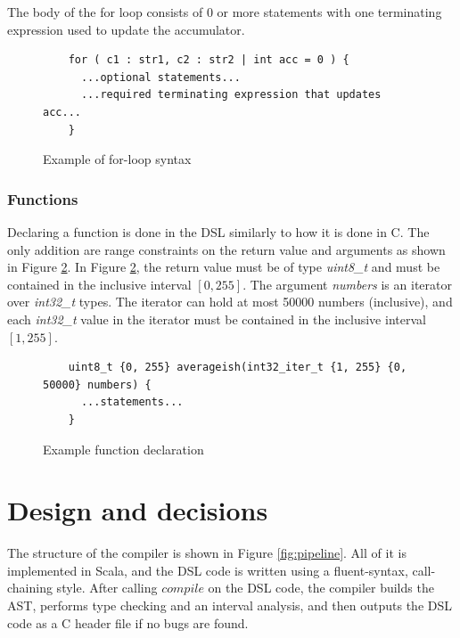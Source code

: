 \documentclass[letterpaper]{article}
\begin{document}
The body of the for loop consists of 0 or more statements with one terminating
expression used to update the accumulator.

\begin{figure}[h]
\centering
\begin{lstlisting}
    for ( c1 : str1, c2 : str2 | int acc = 0 ) {
      ...optional statements...
      ...required terminating expression that updates acc...
    }
\end{lstlisting}
\caption{Example of for-loop syntax}
\label{fig:forloopsyntax}
\end{figure}

\subsubsection{Functions}

Declaring a function is done in the DSL similarly to how it is done in C.
The only addition are range constraints on the return value and arguments
as shown in Figure \ref{fig:functionsyntax}. In Figure \ref{fig:functionsyntax},
the return value must be of type \textit{uint8\_t} and must be contained in
the inclusive interval $[0, 255]$. The argument \textit{numbers} is an iterator
over \textit{int32\_t} types. The iterator can hold at most 50000 numbers (inclusive),
and each \textit{int32\_t} value in the iterator must be contained in the
inclusive interval $[1, 255]$.

\begin{figure}[h]
\centering
\begin{lstlisting}
    uint8_t {0, 255} averageish(int32_iter_t {1, 255} {0, 50000} numbers) {
      ...statements...
    }
\end{lstlisting}
\caption{Example function declaration}
\label{fig:functionsyntax}
\end{figure}

\section{Design and decisions}
\label{sec:design}

The structure of the compiler is shown in Figure \ref{fig:pipeline}. All of it
is implemented in Scala, and the DSL code is written using a fluent-syntax,
call-chaining style. After calling $compile$ on the DSL code, the compiler
builds the AST, performs type checking and an interval analysis, and then
outputs the DSL code as a C header file if no bugs are found.
\end{document}
